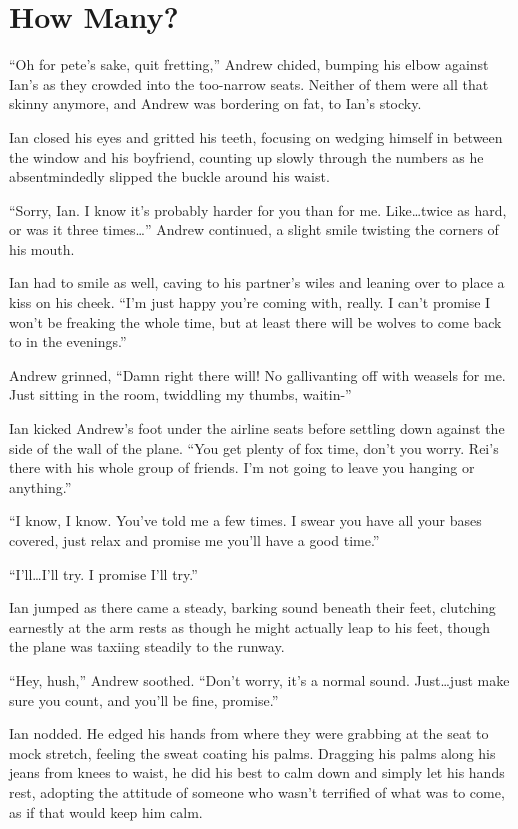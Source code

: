 \chapter{How Many?}

``Oh for pete's sake, quit fretting,'' Andrew chided, bumping his elbow against Ian's as they crowded into the too-narrow seats. Neither of them were all that skinny anymore, and Andrew was bordering on fat, to Ian's stocky.

Ian closed his eyes and gritted his teeth, focusing on wedging himself in between the window and his boyfriend, counting up slowly through the numbers as he absentmindedly slipped the buckle around his waist.

``Sorry, Ian. I know it's probably harder for you than for me. Like\ldots{}twice as hard, or was it three times\ldots{}'' Andrew continued, a slight smile twisting the corners of his mouth.

Ian had to smile as well, caving to his partner's wiles and leaning over to place a kiss on his cheek. ``I'm just happy you're coming with, really. I can't promise I won't be freaking the whole time, but at least there will be wolves to come back to in the evenings.''

Andrew grinned, ``Damn right there will! No gallivanting off with weasels for me. Just sitting in the room, twiddling my thumbs, waitin-''

Ian kicked Andrew's foot under the airline seats before settling down against the side of the wall of the plane. ``You get plenty of fox time, don't you worry. Rei's there with his whole group of friends. I'm not going to leave you hanging or anything.''

``I know, I know. You've told me a few times. I swear you have all your bases covered, just relax and promise me you'll have a good time.''

``I'll\ldots{}I'll try. I promise I'll try.''

Ian jumped as there came a steady, barking sound beneath their feet, clutching earnestly at the arm rests as though he might actually leap to his feet, though the plane was taxiing steadily to the runway.

``Hey, hush,'' Andrew soothed. ``Don't worry, it's a normal sound. Just\ldots{}just make sure you count, and you'll be fine, promise.''

Ian nodded. He edged his hands from where they were grabbing at the seat to mock stretch, feeling the sweat coating his palms. Dragging his palms along his jeans from knees to waist, he did his best to calm down and simply let his hands rest, adopting the attitude of someone who wasn't terrified of what was to come, as if that would keep him calm.


